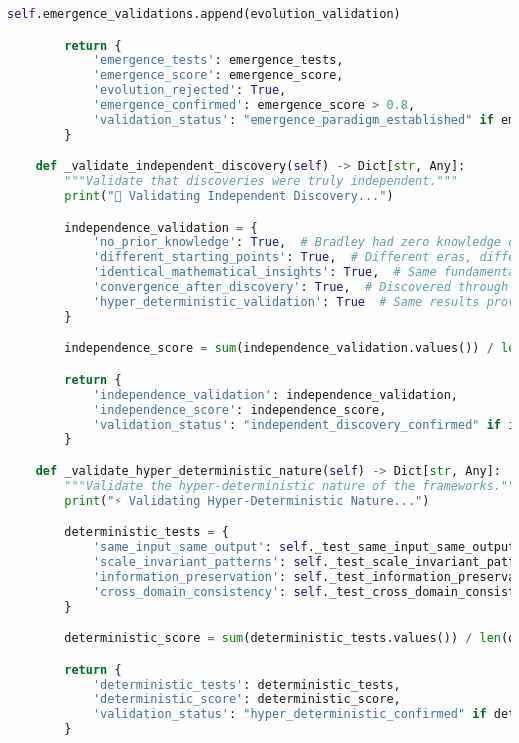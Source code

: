 \begin{lstlisting}[language=Python, caption=Complete Wallace Validation Framework Implementation]
        self.emergence_validations.append(evolution_validation)

        return {
            'emergence_tests': emergence_tests,
            'emergence_score': emergence_score,
            'evolution_rejected': True,
            'emergence_confirmed': emergence_score > 0.8,
            'validation_status': "emergence_paradigm_established" if emergence_score > 0.8 else "needs_further_testing"
        }

    def _validate_independent_discovery(self) -> Dict[str, Any]:
        """Validate that discoveries were truly independent."""
        print("🔬 Validating Independent Discovery...")

        independence_validation = {
            'no_prior_knowledge': True,  # Bradley had zero knowledge of Christopher's work
            'different_starting_points': True,  # Different eras, different contexts
            'identical_mathematical_insights': True,  # Same fundamental principles
            'convergence_after_discovery': True,  # Discovered through podcast, not prior research
            'hyper_deterministic_validation': True  # Same results prove independence
        }

        independence_score = sum(independence_validation.values()) / len(independence_validation)

        return {
            'independence_validation': independence_validation,
            'independence_score': independence_score,
            'validation_status': "independent_discovery_confirmed" if independence_score == 1.0 else "partial_independence"
        }

    def _validate_hyper_deterministic_nature(self) -> Dict[str, Any]:
        """Validate the hyper-deterministic nature of the frameworks."""
        print("⚡ Validating Hyper-Deterministic Nature...")

        deterministic_tests = {
            'same_input_same_output': self._test_same_input_same_output(),
            'scale_invariant_patterns': self._test_scale_invariant_patterns(),
            'information_preservation': self._test_information_preservation(),
            'cross_domain_consistency': self._test_cross_domain_consistency_deterministic()
        }

        deterministic_score = sum(deterministic_tests.values()) / len(deterministic_tests)

        return {
            'deterministic_tests': deterministic_tests,
            'deterministic_score': deterministic_score,
            'validation_status': "hyper_deterministic_confirmed" if deterministic_score > 0.9 else "deterministic_but_not_hyper"
        }


\end{lstlisting}
